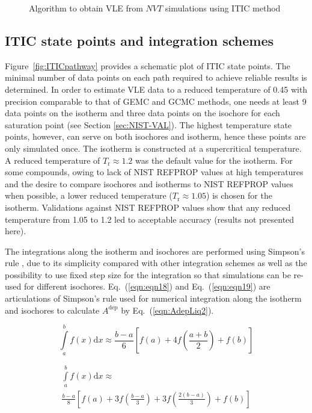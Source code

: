 \documentclass[5p,times]{elsarticle}
\begin{document}
\begin{figure}[]
\begin{tikzpicture}[node distance = 1.5cm, auto,thick,scale=0.8, every node/.style={scale=0.8}]
\end{tikzpicture}
\label{ITIC-algorithm}
\caption{Algorithm to obtain VLE from $NVT$ simulations using ITIC method}
\end{figure}




\subsection{ITIC state points and integration schemes}\label{sec:ITIC-state-points}
Figure~\ref{fig:ITICpathway} provides a schematic plot of ITIC state points. The minimal number of data points on each path required to achieve reliable results is determined. In order to estimate VLE data to a reduced temperature of 0.45 with precision comparable to that of GEMC and GCMC methods, one needs at least 9 data points on the isotherm and three data points on the isochore for each saturation point (see Section \ref{sec:NIST-VAL}). The highest temperature state points, however, can serve on both isochores and isotherm, hence these points are only simulated once. The isotherm is constructed at a supercritical temperature. A reduced temperature of $T_\mathrm{r} \approx 1.2$ was the default value for the isotherm. For some compounds, owing to lack of NIST REFPROP values at high temperatures and the desire to compare isochores and isotherms to NIST REFPROP values when possible, a lower reduced temperature ($T_\mathrm{r} \approx 1.05$) is chosen for the isotherm. Validations against NIST REFPROP values show that any reduced temperature from 1.05 to 1.2 led to acceptable accuracy (results not presented here).


The integrations along the isotherm and isochores are performed using Simpson's rule \cite{atkinson2008}, due to its simplicity compared with other integration schemes as well as the possibility to use fixed step size for the integration so that simulations can be re-used for different isochores. Eq.~(\ref{eqn:eqn18}) and Eq.~(\ref{eqn:eqn19}) are
articulations of Simpson's rule used for numerical integration along the isotherm and isochores to calculate $A^{\mathrm{dep}}$ by Eq.~(\ref{eqn:AdepLiq2}).

\begin{equation}
\int\limits_a^b {f(x)\mathrm{d} x \approx \frac{{b - a}}{6}} \left[ {f(a) + 4f \left( \frac{{a + b}}{2} \right) + f(b)} \right] \label{eqn:eqn18}
\end{equation}

\begin{equation}
\begin{array}{l}
{\int\limits_a^b f(x)\mathrm{d}x \approx }
\\ 
{{\frac{{b - a}}{8} \left[ {f(a) + 3f \left( \frac{{b - a}}{3} \right) + 3f \left( \frac{{2(b - a)}}{3} \right) + f(b)} \right]}}  
\end{array}
\label{eqn:eqn19}
\end{equation}
\end{document}
